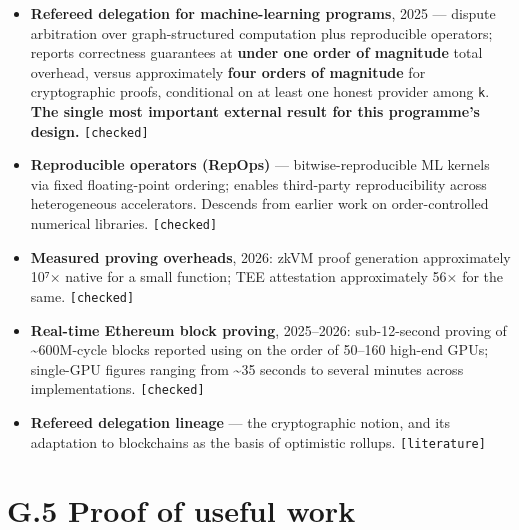 \documentclass[
  11pt]{report}
\providecommand{\tightlist}{%
  \setlength{\itemsep}{0pt}\setlength{\parskip}{0pt}}
\begin{document}
\begin{itemize}
\tightlist
\item
  \textbf{Refereed delegation for machine-learning programs}, 2025 ---
  dispute arbitration over graph-structured computation plus
  reproducible operators; reports correctness guarantees at
  \textbf{under one order of magnitude} total overhead, versus
  approximately \textbf{four orders of magnitude} for cryptographic
  proofs, conditional on at least one honest provider among \texttt{k}.
  \textbf{The single most important external result for this programme's
  design.} \texttt{{[}checked{]}}
\item
  \textbf{Reproducible operators (RepOps)} --- bitwise-reproducible ML
  kernels via fixed floating-point ordering; enables third-party
  reproducibility across heterogeneous accelerators. Descends from
  earlier work on order-controlled numerical libraries.
  \texttt{{[}checked{]}}
\item
  \textbf{Measured proving overheads}, 2026: zkVM proof generation
  approximately 10⁷× native for a small function; TEE attestation
  approximately 56× for the same. \texttt{{[}checked{]}}
\item
  \textbf{Real-time Ethereum block proving}, 2025--2026: sub-12-second
  proving of \textasciitilde600M-cycle blocks reported using on the
  order of 50--160 high-end GPUs; single-GPU figures ranging from
  \textasciitilde35 seconds to several minutes across implementations.
  \texttt{{[}checked{]}}
\item
  \textbf{Refereed delegation lineage} --- the cryptographic notion, and
  its adaptation to blockchains as the basis of optimistic rollups.
  \texttt{{[}literature{]}}
\end{itemize}

\hypertarget{g.5-proof-of-useful-work}{%
\section{G.5 Proof of useful work}\label{g.5-proof-of-useful-work}}
\end{document}
